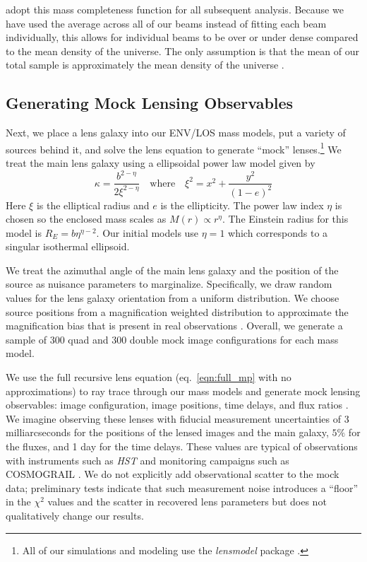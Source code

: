 \documentclass{emulateapj}
\providecommand{\DIFaddtex}[1]{{\protect\color{blue}\uwave{#1}}} %
\providecommand{\DIFaddbegin}{} %
\providecommand{\DIFaddend}{} %
\providecommand{\DIFadd}[1]{\texorpdfstring{\DIFaddtex{#1}}{#1}} %
\begin{document}
\DIFadd{We }\DIFaddend adopt this mass completeness function for all subsequent analysis. Because we have used the average across all of our beams instead of fitting each beam individually, this allows for individual beams to be over or under dense compared to the mean density of the universe. The only assumption is that the mean of our total sample is approximately the mean density of the universe \DIFaddbegin \DIFadd{in each redshift bin}\DIFaddend . 

\subsection{Generating Mock Lensing Observables} \label{sec:observables}

Next, we place a lens galaxy into our ENV/LOS mass models, put a variety of sources behind it, and solve the lens equation to generate ``mock'' lenses.\footnote{All of our simulations and modeling use the \emph{lensmodel} package \citep{Keeton01}.}  We treat the main lens galaxy using a ellipsoidal power law model given by
\begin{equation}
\label{eqn:powerlaw}
\kappa = \frac{b^{2-\eta}}{2 \xi^{2-\eta}}
\quad\mbox{where}\quad
\xi^2 = x^2 + \frac{y^2}{(1-e)^2}
\end{equation}
Here $\xi$ is the elliptical radius and $e$ is the ellipticity.  The power law index $\eta$ is chosen so the enclosed mass scales as $M(r) \propto r^\eta$.
The Einstein radius for this model is $R_E = b \eta^{\eta - 2}$. Our initial models use $\eta = 1$ which corresponds to a singular isothermal ellipsoid.

We treat the azimuthal angle of the main lens galaxy and the position of the source as nuisance parameters to marginalize.  Specifically, we draw random values for the lens galaxy orientation from a uniform distribution.  We choose source positions from a magnification weighted distribution to approximate the magnification bias that is present in real observations \citep[see][]{Keeton04}. Overall, we generate a sample of 300 quad and 300 double mock image configurations for each mass model.

We use the full recursive lens equation (eq.\ \ref{eqn:full_mp} with no approximations) to ray trace through our mass models and generate mock lensing observables: image configuration, image positions, time delays, and flux ratios \DIFaddbegin \DIFadd{(similar to \mbox{%
\citealt{Petkova14}}%
)}\DIFaddend . We imagine observing these lenses with fiducial measurement uncertainties of 3 milliarcseconds for the positions of the lensed images and the main galaxy, $5\%$ for the fluxes, and 1 day for the time delays. These values are typical of observations with instruments such as \emph{HST} and monitoring campaigns such as COSMOGRAIL \citep{Eigenbrod05}. We do not explicitly add observational scatter to the mock data; preliminary tests indicate that such measurement noise introduces a ``floor'' in the $\chi^2$ values and the scatter in recovered lens parameters but does not qualitatively change our results.
\end{document}
